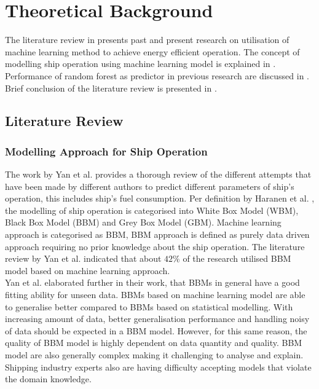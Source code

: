 \section{Theoretical Background} \label{theory}

The literature review in  presents past and present research on utilisation of machine learning method to achieve energy efficient operation. The concept of modelling ship operation using machine learning model is explained in . Performance of random forest as predictor in previous research are discussed in . Brief conclusion of the literature review is presented in .\\

\subsection{Literature Review}\label{litreview}

\subsubsection{Modelling Approach for Ship Operation}\label{ship_modelling}

The work by Yan et al. \cite{Yan.2021} provides a thorough review of the different attempts that have been made by different authors to predict different parameters of ship's operation, this includes ship's fuel consumption. Per definition by Haranen et al. \cite{MichaelHaranen.2016}, the modelling of ship operation is categorised into White Box Model (WBM), Black Box Model (BBM) and Grey Box Model (GBM). Machine learning approach is categorised as BBM, BBM approach is defined as purely data driven approach requiring no prior knowledge about the ship operation. The literature review by Yan et al. \cite{Yan.2021} indicated that about $42\%$ of the research utilised BBM model based on machine learning approach.\\ 

Yan et al. \cite{Yan.2021} elaborated further in their work, that BBMs in general have a good fitting ability for unseen data. BBMs based on machine learning model are able to generalise better compared to BBMs based on statistical modelling. With increasing amount of data, better generalisation performance and handling noisy of data should be expected in a BBM model. However, for this same reason, the quality of BBM model is highly dependent on data quantity and quality. BBM model are also generally complex making it challenging to analyse and explain. Shipping industry experts also are having difficulty accepting models that violate the domain knowledge.\\   

